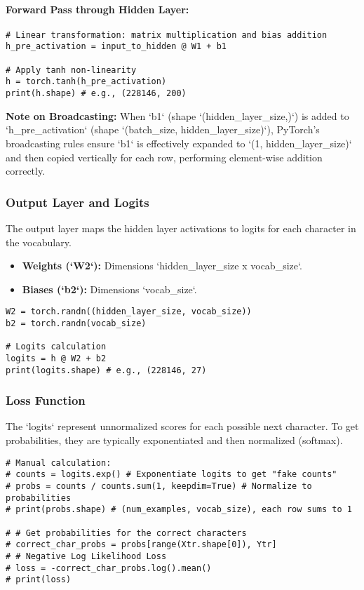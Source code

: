 \paragraph{Forward Pass through Hidden Layer:}
\begin{lstlisting}[caption=Hidden Layer Computation]
# Linear transformation: matrix multiplication and bias addition
h_pre_activation = input_to_hidden @ W1 + b1

# Apply tanh non-linearity
h = torch.tanh(h_pre_activation)
print(h.shape) # e.g., (228146, 200)
\end{lstlisting}

\textbf{Note on Broadcasting:} When `b1` (shape `(hidden_layer_size,)`) is added to `h_pre_activation` (shape `(batch_size, hidden_layer_size)`), PyTorch's broadcasting rules ensure `b1` is effectively expanded to `(1, hidden_layer_size)` and then copied vertically for each row, performing element-wise addition correctly.

\subsubsection{Output Layer and Logits}
The output layer maps the hidden layer activations to logits for each character in the vocabulary.
\begin{itemize}
    \item \textbf{Weights (`W2`):} Dimensions `hidden_layer_size x vocab_size`.
    \item \textbf{Biases (`b2`):} Dimensions `vocab_size`.
\end{itemize}

\begin{lstlisting}[caption=Output Layer Parameter Initialization and Logit Calculation]
W2 = torch.randn((hidden_layer_size, vocab_size))
b2 = torch.randn(vocab_size)

# Logits calculation
logits = h @ W2 + b2
print(logits.shape) # e.g., (228146, 27)
\end{lstlisting}

\subsubsection{Loss Function}
The `logits` represent unnormalized scores for each possible next character. To get probabilities, they are typically exponentiated and then normalized (softmax).

\begin{lstlisting}[caption=Manual Probability and NLL Loss Calculation (for illustration)]
# Manual calculation:
# counts = logits.exp() # Exponentiate logits to get "fake counts"
# probs = counts / counts.sum(1, keepdim=True) # Normalize to probabilities
# print(probs.shape) # (num_examples, vocab_size), each row sums to 1

# # Get probabilities for the correct characters
# correct_char_probs = probs[range(Xtr.shape[0]), Ytr]
# # Negative Log Likelihood Loss
# loss = -correct_char_probs.log().mean()
# print(loss)
\end{lstlisting}

